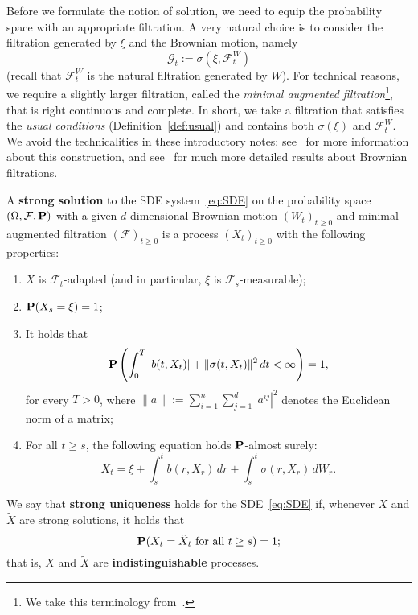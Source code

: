 Before we formulate the notion of solution, we need to equip the probability space with an appropriate filtration. A very natural choice is to consider the filtration generated by $\xi$ and the Brownian motion, namely
\begin{equation*}
	\mathcal{G}_t := \sigma(\xi, \mathcal{F}^W_t)
\end{equation*}
(recall that $\mathcal{F}^W_t$ is the natural filtration generated by $W$). For technical reasons, we require a slightly larger filtration, called the \emph{minimal augmented filtration}\footnote{We take this terminology from~\cite{Bass2}.}, that is right continuous and complete. In short, we take a filtration that satisfies the \emph{usual conditions} (Definition~\ref{def:usual}) and contains both $\sigma(\xi)$ and $\mathcal{F}^W_t$. We avoid the technicalities in these introductory notes: see~\cite[p.\ 2]{Bass2} for more information about this construction, and see~\cite[Section 2.7]{KS} for much more detailed results about Brownian filtrations.

\begin{definition}
	A \textbf{strong solution} to the SDE system~\eqref{eq:SDE} on the probability space $(\Omega,\mathcal{F},\mathbf{P})$ with a given $d$-dimensional Brownian motion $(W_t)_{t\ge 0}$ and minimal augmented filtration $(\mathcal{F})_{t\ge 0}$ is a process $(X_t)_{t\ge 0}$ with the following properties:
	\begin{enumerate}[\upshape (i)]
		\item $X$ is $\mathcal{F}_t$-adapted (and in particular, $\xi$ is $\mathcal{F}_s$-measurable);
		\item $\mathbf{P}(X_s=\xi)=1$;
		\item It holds that
		\begin{equation*}
			\mathbf{P}\left(\int_0^T |b(t,X_t)| + \|\sigma(t,X_t)\|^2\,dt <\infty\right) = 1,
		\end{equation*}
		for every $T>0$, where $\|a\| := \sum_{i=1}^n\sum_{j=1}^d |a^{ij}|^2$ denotes the Euclidean norm of a matrix;
		\item For all $t\ge s$, the following equation holds $\mathbf{P}$-almost surely:
		\begin{equation*}
			X_t = \xi + \int_s^t b(r,X_r)\,dr + \int_s^t \sigma(r,X_r)\,dW_r.
		\end{equation*}
	\end{enumerate}
	
	We say that \textbf{strong uniqueness} holds for the SDE~\eqref{eq:SDE} if, whenever $X$ and $\tilde{X}$ are strong solutions, it holds that
	\begin{equation*}
		\mathbf{P}(X_t=\tilde{X}_t \text{ for all }t\ge s) = 1;
	\end{equation*}
	that is, $X$ and $\tilde{X}$ are \textbf{indistinguishable} processes.
\end{definition}

